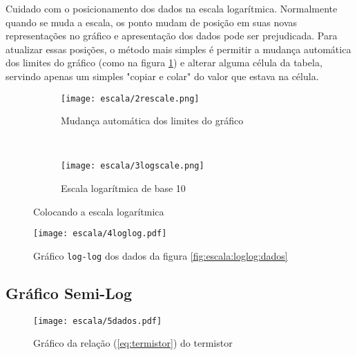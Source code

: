     \begin{lembrete}
        Cuidado com o posicionamento dos dados na escala logarítmica. Normalmente quando se muda a escala, os ponto mudam de posição em suas novas representações no gráfico e apresentação dos dados pode ser prejudicada. Para atualizar essas posições, o método mais simples é permitir a mudança automática dos limites do gráfico (como na figura \ref{fig:escala:rescale}) e alterar alguma célula da tabela, servindo apenas um simples "copiar e colar" do valor que estava na célula.
    \end{lembrete}

    \begin{figure}[htbp]
        \centering
        \begin{subfigure}{0.45\textwidth}
            \centering
            \texttt{[image: escala/2rescale.png]}

            \caption{Mudança automática dos limites do gráfico}
            \label{fig:escala:rescale}
        \end{subfigure}
        ~
        \begin{subfigure}{0.45\textwidth}
            \centering
            \texttt{[image: escala/3logscale.png]}

            \caption{Escala logarítmica de base 10}
            \label{fig:escala:logscale}
        \end{subfigure}
        \caption{Colocando a escala logarítmica}
        \label{fig:escala:tutorial}
    \end{figure}

    \begin{figure}[htbp]
        \centering
        \texttt{[image: escala/4loglog.pdf]}

        \caption{Gráfico \texttt{log-log} dos dados da figura \ref{fig:escala:loglog:dados}}
        \label{fig:escala:loglog:resultado}
    \end{figure}


\subsection{Gráfico Semi-Log}

    \begin{figure}[htbp]
        \centering
        \texttt{[image: escala/5dados.pdf]}

        \caption{Gráfico da relação (\ref{eq:termistor}) do termistor}
        \label{fig:escala:semilog:dados}
    \end{figure}

